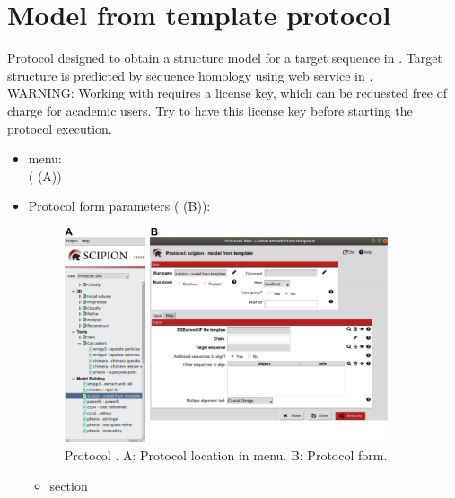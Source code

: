 \section{Model from template protocol}
\label{app:modelFromTemplate}%
Protocol designed to obtain a structure model for a target sequence in \scipion. Target structure is predicted by sequence homology using \modeller \citep{sali1993} web service in \chimera.\\
WARNING: Working with \modeller requires a license key, which can be requested free of charge for academic users. Try to have this license key before starting the protocol execution.\\ 

   
 \begin{itemize}
  \item \scipion menu:\\
   ( (A))\\
  
  \item Protocol form parameters ( (B)):\\
  
  \begin{figure}[H]
    \centering 
    \captionsetup{width=.7\linewidth} 
    \includegraphics[width=0.90\textwidth]{Images_appendix/Fig111.pdf}
    \caption{Protocol . A: Protocol location in \scipion menu. B: Protocol form.}
    \label{fig:app_protocol_seqHomology_1}
   \end{figure}
  
  \begin{itemize}
   \item {} section\\
  


\end{itemize}
\end{itemize}
